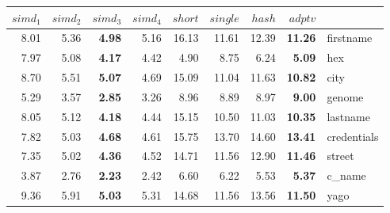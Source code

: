 {\renewcommand{\tabcolsep}{0.5mm}\renewcommand{\arraystretch}{0.93}\begin{tabular}{|rrrr|rrrr|l|}
\hline
{\scriptsize{$simd_1$}}&{\scriptsize{$simd_2$}}&{\scriptsize{\bf $simd_3$}}&{\scriptsize{$simd_4$}}&{\scriptsize{$short$}}&{\scriptsize{$single$}}&{\scriptsize{$hash$}}&{\scriptsize{\bf $adptv$}}&\\
\hline
\hline
{\scriptsize{ 8.01}}& {\scriptsize{ 5.36}}& {\scriptsize{\bf  4.98}}& {\scriptsize{ 5.16}}& {\scriptsize{16.13}}& {\scriptsize{11.61}}& {\scriptsize{12.39}}& {\scriptsize{\bf 11.26}}& {\scriptsize firstname}\\
{\scriptsize{ 7.97}}& {\scriptsize{ 5.08}}& {\scriptsize{\bf  4.17}}& {\scriptsize{ 4.42}}& {\scriptsize{ 4.90}}& {\scriptsize{ 8.75}}& {\scriptsize{ 6.24}}& {\scriptsize{\bf  5.09}}& {\scriptsize hex}\\
{\scriptsize{ 8.70}}& {\scriptsize{ 5.51}}& {\scriptsize{\bf  5.07}}& {\scriptsize{ 4.69}}& {\scriptsize{15.09}}& {\scriptsize{11.04}}& {\scriptsize{11.63}}& {\scriptsize{\bf 10.82}}& {\scriptsize city}\\
{\scriptsize{ 5.29}}& {\scriptsize{ 3.57}}& {\scriptsize{\bf  2.85}}& {\scriptsize{ 3.26}}& {\scriptsize{ 8.96}}& {\scriptsize{ 8.89}}& {\scriptsize{ 8.97}}& {\scriptsize{\bf  9.00}}& {\scriptsize genome}\\
{\scriptsize{ 8.05}}& {\scriptsize{ 5.12}}& {\scriptsize{\bf  4.18}}& {\scriptsize{ 4.44}}& {\scriptsize{15.15}}& {\scriptsize{10.50}}& {\scriptsize{11.03}}& {\scriptsize{\bf 10.35}}& {\scriptsize lastname}\\
{\scriptsize{ 7.82}}& {\scriptsize{ 5.03}}& {\scriptsize{\bf  4.68}}& {\scriptsize{ 4.61}}& {\scriptsize{15.75}}& {\scriptsize{13.70}}& {\scriptsize{14.60}}& {\scriptsize{\bf 13.41}}& {\scriptsize credentials}\\
{\scriptsize{ 7.35}}& {\scriptsize{ 5.02}}& {\scriptsize{\bf  4.36}}& {\scriptsize{ 4.52}}& {\scriptsize{14.71}}& {\scriptsize{11.56}}& {\scriptsize{12.90}}& {\scriptsize{\bf 11.46}}& {\scriptsize street}\\
{\scriptsize{ 3.87}}& {\scriptsize{ 2.76}}& {\scriptsize{\bf  2.23}}& {\scriptsize{ 2.42}}& {\scriptsize{ 6.60}}& {\scriptsize{ 6.22}}& {\scriptsize{ 5.53}}& {\scriptsize{\bf  5.37}}& {\scriptsize c\_name}\\
{\scriptsize{ 9.36}}& {\scriptsize{ 5.91}}& {\scriptsize{\bf  5.03}}& {\scriptsize{ 5.31}}& {\scriptsize{14.68}}& {\scriptsize{11.56}}& {\scriptsize{13.56}}& {\scriptsize{\bf 11.50}}& {\scriptsize yago}\\

\end{tabular}}

